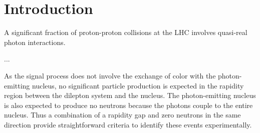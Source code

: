 \section{Introduction}

A significant fraction of proton-proton collisions at the LHC involves quasi-real photon interactions.

...~\cite{Chatrchyan:2011ci}


As the signal process does not involve the exchange of color with the photon-emitting nucleus, no significant particle production is expected in the rapidity region between the dilepton system and the nucleus. 
The photon-emitting nucleus is also expected to produce no neutrons because the photons couple to the entire nucleus. 
Thus a combination of a rapidity gap and zero neutrons in the same direction provide straightforward criteria to identify these events experimentally. 
